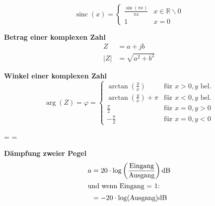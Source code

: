 \documentclass[12pt, a4paper, twoside]{scrartcl}
\begin{document}
\begin{minipage}{.5\linewidth}
  \[
    \operatorname{sinc}(x)=
    \begin{cases}
      \frac{\sin(\pi x)}{\pi x} & x \in\mathbb{R} \backslash 0\\
      1 & x = 0
    \end{cases}
  \]
\end{minipage}%
\begin{minipage}{.5\linewidth}
  \begin{center}
  \end{center}
\end{minipage}

\textbf{Betrag einer komplexen Zahl}
\begin{align*}
  Z &= a + jb\\
  |Z| &= \sqrt{a^2 +b^2}
\end{align*}

\textbf{Winkel einer komplexen Zahl}
\[\arg (Z) = \varphi =
  \begin{cases}
    \arctan \left(\frac{y}{x}\right) & \text{für } x>0, y \text{ bel.}\\
    \arctan \left(\frac{y}{x}\right) + \pi & \text{für } x<0, y \text{ bel.}\\
    \frac{\pi}{2} & \text{für } x = 0, y > 0\\
    - \frac{\pi}{2} & \text{für } x = 0,y < 0
  \end{cases}\]

\begin{samepage}
  \nopagebreak
  \begin{mathframed}
    \cos \varphi =  \qquad
    \sin \varphi = 
  \end{mathframed}
\end{samepage}


\textbf{Dämpfung zweier Pegel}
\begin{align*}
  a &= 20 \cdot \log \left(\frac{\text{Eingang}}{\text{Ausgang}} \right) \si{\decibel}\\
  \intertext{und wenn Eingang = 1:}
  &= -20 \cdot \log(\text{Ausgang}) \si{\decibel}
\end{align*}
\end{document}
